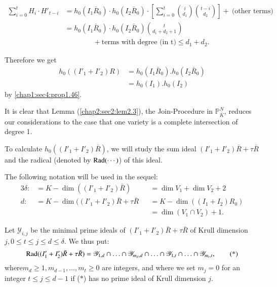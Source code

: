 \begin{align*}
  \sum^{t}_{i=0} H_i\cdot H'_{t-i} & = h_0 (I_1
  \bar{R}_0)\cdot h_0 (I_2 \bar{R}_0) \cdot [\sum^{t}_{i=0}
    \binom{i}{d_1} \binom{t-i}{d_2}] + ~\text {
    (other terms)}\\ 
  & = h_0 (I_1 \bar{R}_0)\cdot h_0(I_2 \bar{R}_0) \binom{t}{d_1+d_2+1}\\ 
  & \qquad \qquad + \text{terms with degree (in t)} \le d_1 + d_2.  
\end{align*}

Therefore we get
\begin{align*}
  h_0 ((I'_1+I'_2) R) & = h_0 (I_1 \bar{R}_0). h_0 (I_2 \bar{R}_0)\\
  & = h_0 (I_1). h_0 (I_2) 
\end{align*}
by \ref{chap1:sec4:prop1.46}.

It is clear that Lemma (\ref{chap2:sec2:lem2.3}), the Join-Procedure in
$\mathbb{P}^N_{\bar{K}}$, reduces our considerations to the case that
one variety is a complete intersection of degree 1. 

To calculate $h_0((I'_1 + I'_2) \bar{R})$, we will study the sum ideal
$(I'_1 + I'_2) \bar{R}+\tau \bar{R}$ and the radical (denoted by $\operatorname{Rad} 
(\cdots)$) of this ideal. 

\setcounter{notation}{3}
\begin{notation}\label{chap2:sec2:not2.4}
  The following notation will be used in the sequel: 
  \begin{alignat*}{3}
    \delta:  &= K-\dim (( I'_1 + I'_2) \bar{R})  &&=  \dim V_1 + \dim V_2 + 2\\
    d:  &= K-\dim ((I'_1 + I'_2) \bar{R} + \tau \bar{R} && =  K-\dim ((I_1 +
    I_2) R_0)\\ 
    && & = \dim (V_1 \cap V_2) + 1.
  \end{alignat*}
\end{notation}

Let $\mathscr{Y}_{i, j}$ be the minimal prime ideals of $(I'_1 + I'_2)
\bar{R} + \tau \bar{R}$ of Krull dimension $j, 0 \le t \le j \le d \le
\delta$. We thus put:  
\begin{equation}
   \operatorname{Rad}  ((I'_1+I'_2) \bar{R} + \tau \bar{R}) = \mathscr{Y}_{1,
    d} \cap \ldots \cap \mathscr{Y}_{m_d,d} \cap \ldots \cap
  \mathscr{Y}_{1, t} \cap \ldots \cap \mathscr{Y}_{m_t,t}, \tag{*} 
\end{equation}
where\pageoriginale $m_d \ge 1, m_{d-1}, \ldots,  m_t \ge 0$ are
integers, and where 
we set $m_j = 0$ for an integer $t \le j \le d-1$ if ($*$) has no
prime ideal of Krull dimension $j$. 

